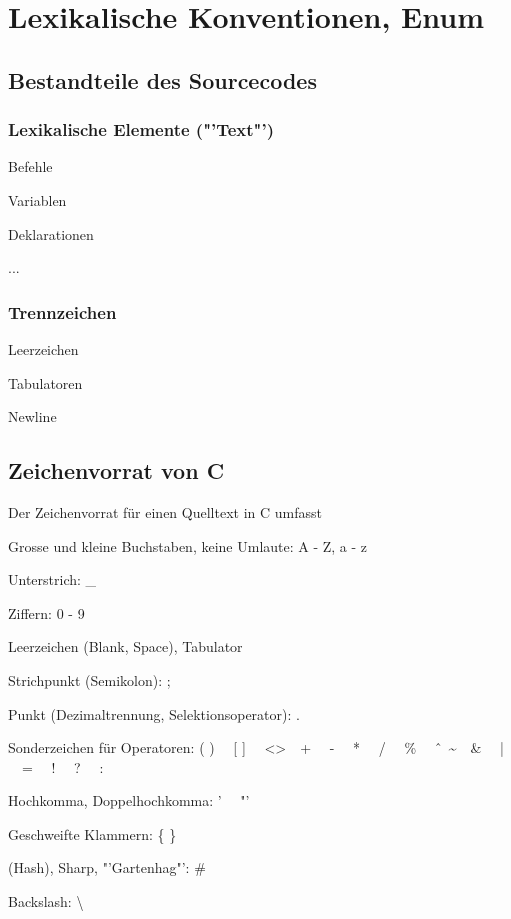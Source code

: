 \section{Lexikalische Konventionen, Enum}
 	\subsection{Bestandteile des Sourcecodes}
 		\begin{minipage}[t]{8 cm}
 			\subsubsection{Lexikalische Elemente ("'Text"')}
 				\begin{compactitem}
 					\item Befehle
 					\item Variablen
 					\item Deklarationen
 					\item ... 
 				\end{compactitem}
 		\end{minipage}
 		\hspace*{0.5cm}
 		\begin{minipage}[t]{8 cm}
 			\subsubsection{Trennzeichen}
 				\begin{compactitem}
 					\item Leerzeichen
 					\item Tabulatoren
 					\item Newline
 				\end{compactitem}
 		\end{minipage}
 	\subsection{Zeichenvorrat von C}
 		Der Zeichenvorrat für einen Quelltext in C umfasst
 			\begin{compactitem}
 				\item Grosse und kleine Buchstaben, keine Umlaute: A - Z, a - z 
 				\item Unterstrich: \_
 				\item Ziffern: 0 - 9
 				\item Leerzeichen (Blank, Space), Tabulator
 				\item Strichpunkt (Semikolon): ;
 				\item Punkt (Dezimaltrennung, Selektionsoperator): .
 				\item Sonderzeichen für Operatoren: ( ) \ \ [ ] \ \ \textless  	\textgreater \ \  + \ \ - \ \ * \ \ / \ \ \% \ \ \^ \ \ \textasciitilde \ \ \& \ \ | \ \ = \ \ ! \ \ ? \ \ :
 				\item Hochkomma, Doppelhochkomma: ' \ \ "'
 				\item Geschweifte Klammern: \{ \}
 				\item (Hash), Sharp, "'Gartenhag"': \#
 				\item Backslash: \textbackslash 	
 			\end{compactitem} 	
